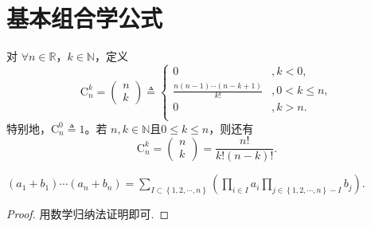 \documentclass[../../main.tex]{subfiles}
\begin{document}
\section{基本组合学公式}

\begin{definition}[组合数定义的扩充]\label{definition:组合数定义的扩充}
对 \( \forall n \in \mathbb{R} \)，\( k \in \mathbb{N} \)，定义
\[
\mathrm{C}_{n}^{k} = \begin{pmatrix} n \\ k \end{pmatrix} \triangleq \begin{cases}
0&,k<0,\\
\frac{n(n - 1) \cdots (n - k + 1)}{k!}&,0< k\leqslant n ,\\
0&,k>n.\\
\end{cases}
\]
特别地，\( \mathrm{C}_{n}^{0} \triangleq 1 \)。若 \( n, k \in \mathbb{N} \)且$0\leqslant k\leqslant n$，则还有
\[
\mathrm{C}_{n}^{k} = \begin{pmatrix} n \\ k \end{pmatrix} = \frac{n!}{k! (n - k)!}.
\]
\end{definition}

\begin{theorem}[二项式定理的推广]\label{theorem:二项式定理的推广}
$\left( a_1+b_1 \right)\cdots \left( a_n+b_n \right) =\sum_{I\subset \left\{ 1,2,\cdots ,n \right\}}{\left( \prod_{i\in I}{a_i}\prod_{j\in \left\{ 1,2,\cdots ,n \right\} -I}{b_j} \right)}.$
\end{theorem}
\begin{proof}
用数学归纳法证明即可.
\end{proof}
\end{document}
